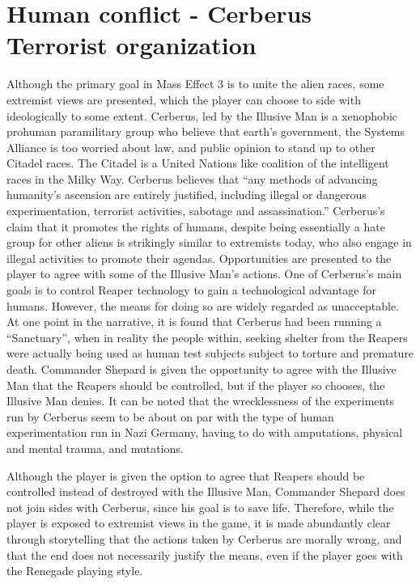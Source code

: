 \documentclass[journal]{IEEEtran}
\begin{document}
\section{Human conflict - Cerberus Terrorist organization}
Although the primary goal in Mass Effect 3 is to unite the alien races, some
extremist views are presented, which the player can choose to side
with ideologically to some extent. Cerberus, led by the Illusive Man is
a xenophobic prohuman paramilitary group \cite{chrisb}\cite{wikia}
who believe that earth's government, the Systems Alliance is too
worried about law, and public opinion to stand up to other Citadel races.
The Citadel is a United Nations like coalition of the intelligent races in the Milky Way. Cerberus believes that ``any methods of advancing humanity's ascension are entirely justified, including illegal or dangerous experimentation, terrorist activities, sabotage and assassination.''\cite{wikia}
Cerberus's claim that it promotes the rights of humans, despite being
essentially a hate group for other aliens is strikingly similar to
extremists today, who also engage in illegal activities
to promote their agendas. Opportunities are presented to the player to agree with some of the
Illusive Man's actions. One of
Cerberus's main goals is to control Reaper technology to gain a technological
advantage for humans. However, the means for doing so are widely regarded as unacceptable. At one point in the narrative, it is found that Cerberus
had been running a ``Sanctuary'', when in reality the people within, seeking
shelter from the Reapers were actually being used as human test subjects
subject to torture and premature death. Commander Shepard is given the opportunity to agree with the Illusive Man that the Reapers should be controlled, but if the player so chooses, the Illusive Man denies.
It can be noted that the wrecklessness of the experiments run by Cerberus
seem to be about on par with the type of human experimentation run in
Nazi Germany, having to do with amputations, physical and mental trauma, and mutations.

Although the player is given the option to agree that Reapers should
be controlled instead of destroyed with the Illusive Man, Commander
Shepard does not join sides with Cerberus, since his goal is to save life.
Therefore, while the player is exposed to extremist views in the game,
it is made abundantly clear through storytelling that the actions taken
by Cerberus are morally wrong, and that the end does not necessarily justify
the means, even if the player goes with the Renegade playing style.
\end{document}
